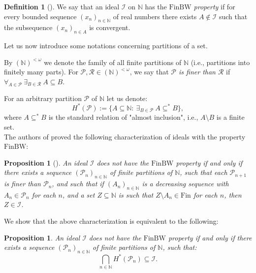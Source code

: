 \documentclass{amsart}
\newtheorem{prop}[thm]{Proposition}
\theoremstyle{definition}
\newtheorem{df}[thm]{Definition}
\newcommand{\N}{{\mathbb N}}
\newcommand{\Fin}{\textrm{Fin}}
\newcommand{\I}{\mathcal I}
\newcommand{\finbw}{\text{FinBW}}
\newcommand{\FinPart}{(\N)^{< \omega}}
\begin{document}
\begin{df}[\cite{H1}]
We say that an ideal $\I$ on $\N$ has the \emph{$\finbw$ property} if for every bounded sequence $(x_n)_{n\in\N}$ of real numbers there exists $A\notin\I$ such that the subsequence $(x_n)_{n\in A}$ is convergent.
\end{df}


Let us now introduce some notations concerning partitions of a set. 

By $\FinPart$ we denote the family of all finite partitions of $\N$ (i.e., partitions into finitely many parts). For $\mathcal{P}, \mathcal{R} \in \FinPart$, we say that \emph{$\mathcal{P}$ is finer than $\mathcal{R}$} if $\forall_{A \in \mathcal{P}}\ \exists_{B \in \mathcal{R}}\ A \subseteq B$.

For an arbitrary partition $\mathcal{P}$ of $\N$ let us denote: 
$$H^{*}(\mathcal{P}) := \{A\subseteq\N :\ \exists_{B\in\mathcal{P}}\ A\subseteq^{*} B\},$$ 
where $A\subseteq^{*} B$ is the standard relation of "almost inclusion", i.e., $A\setminus B$ is a finite set.\\

The authors of \cite{BFMS11} proved the following characterization of ideals with the property $\finbw$:

\begin{prop}[{\cite[Proposition 3]{BFMS11}}] \label{tree-fin-bw}
An ideal $\I$ does not have the $\finbw$ property if and only if there exists a sequence $(\mathcal{P}_n)_{n\in\N}$ of finite partitions of $\N$, such that each $\mathcal{P}_{n+1}$ is finer than $\mathcal{P}_n$, and such that if $(A_n)_{n\in\N}$ is a decreasing sequence with $A_n \in \mathcal{P}_n$ for each $n$, and a set $Z\subseteq\N$ is such that $Z\setminus A_n \in\Fin$ for each $n$, then $Z\in\I$.
\end{prop}

We show that the above characterization is equivalent to the following:

\begin{prop}
An ideal $\I$ does not have the $\finbw$ property if and only if there exists a sequence $(\mathcal{P}_n)_{n\in\N}$ of finite partitions of $\N$, such that: 
$$\bigcap_{n\in\N}{H^{*}(\mathcal{P}_n)}\subseteq\I.$$
\end{prop}
\end{document}
